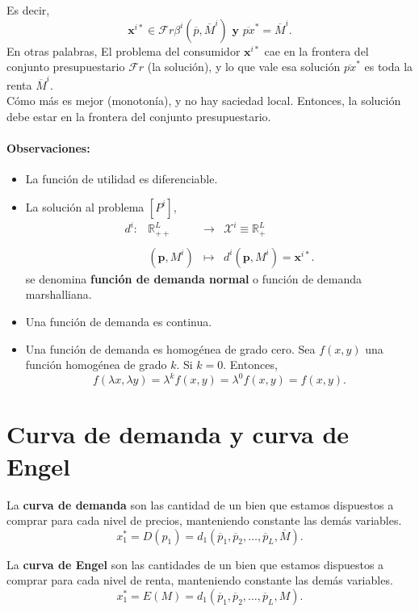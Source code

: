 Es decir,
$$\textbf{x}^{i*}\in \mathcal{F}r \beta^i\left(\overline{p},\overline{M}^i\right) \textbf{ y }  \overline{px}^* = \overline{M}^i.$$
En otras palabras,
El problema del consumidor $\textbf{x}^{i*}$ cae en la frontera del conjunto presupuestario $\mathcal{F}r$ (la solución), y lo que vale esa solución $\overline{px}^*$ es toda la renta $\overline{M}^i$. \\

Cómo más es mejor (monotonía), y no hay saciedad local. Entonces, la solución debe estar en la frontera del conjunto presupuestario. 

\paragraph{Observaciones:} 

\begin{itemize}
    \item La función de utilidad es diferenciable.
    \item La solución al problema $\left[P^i\right]$,
	$$
	\begin{array}{rrcl}
	    d^i: & \mathbb{R}_{++}^L & \to & \mathcal{X}^i\equiv\mathbb{R}^L_+\\\\
		 & \left(\textbf{p},M^i\right) & \mapsto & d^i\left(\textbf{p},M^i\right) = \textbf{x}^{i*}.
	\end{array}
	$$
    se denomina \textbf{función de demanda normal} o función de demanda marshalliana.
    \item Una función de demanda es continua.
    \item Una función de demanda es homogénea de grado cero.
	Sea $f(x,y)$ una función homogénea de grado $k$. Si $k=0$.  Entonces,
	$$f(\lambda x, \lambda y) = \lambda^k f(x,y) = \lambda^0 f(x,y)= f(x,y).$$
\end{itemize}

\section{Curva de demanda y curva de Engel}
La \textbf{curva de demanda} son las cantidad de un bien que estamos dispuestos a comprar para cada nivel de precios, manteniendo constante las demás variables.
$$x_1^* = D(p_1)=d_1(\overline{p}_1,\overline{p}_2,\ldots,\overline{p}_L,\overline{M}).$$

La \textbf{curva de Engel} son las cantidades de un bien que estamos dispuestos a comprar para cada nivel de renta, manteniendo constante las demás variables.
$$x_1^* = E(M)=d_1(\overline{p}_1,\overline{p}_2,\ldots,\overline{p}_L,M).$$

